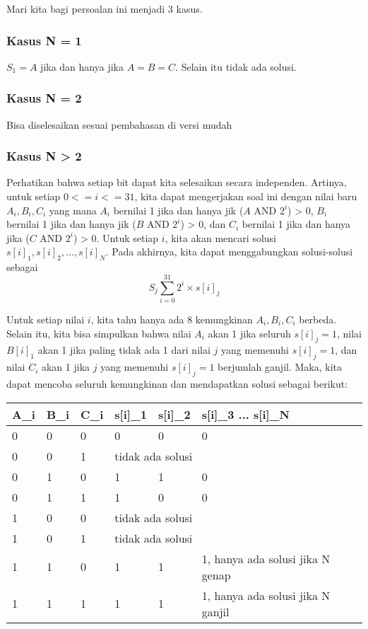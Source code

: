 \documentclass[../editorial_template.tex]{subfiles} %
\begin{document}
Mari kita bagi persoalan ini menjadi 3 kasus.
\subsubsection{Kasus N = 1}

$S_1 = A$ jika dan hanya jika $A = B = C$. Selain itu tidak ada solusi.

\subsubsection{Kasus N = 2}

Bisa diselesaikan sesuai pembahasan di versi mudah

\subsubsection{Kasus N > 2}

Perhatikan bahwa setiap bit dapat kita selesaikan secara independen. Artinya, untuk setiap $0 <= i <= 31$, kita dapat mengerjakan soal ini dengan nilai baru $A_i, B_i, C_i$ yang mana $A_i$ bernilai 1 jika dan hanya jik ($A$ AND $2^i$) > 0, $B_i$ bernilai 1 jika dan hanya jik ($B$ AND $2^i$) > 0, dan $C_i$ bernilai 1 jika dan hanya jika ($C$ AND $2^i$) > 0. Untuk setiap $i$, kita akan mencari solusi $s[i]_1, s[i]_2, ..., s[i]_N$. Pada akhirnya, kita dapat menggabungkan solusi-solusi sebagai $$S_j \sum_{i=0}^{31} 2^i \times s[i]_j$$

Untuk setiap nilai $i$, kita tahu hanya ada 8 kemungkinan $A_i, B_i, C_i$ berbeda. Selain itu, kita bisa simpulkan bahwa nilai $A_i$ akan 1 jika seluruh $s[i]_j = 1$, nilai $B[i]_1$ akan 1 jika paling tidak ada 1 dari nilai $j$ yang memenuhi $s[i]_j = 1$, dan nilai $C_i$ akan 1 jika $j$ yang memenuhi $s[i]_j = 1$ berjumlah ganjil. Maka, kita dapat mencoba seluruh kemungkinan dan mendapatkan solusi sebagai berikut:

\begin{table}[]
\centering
\begin{tabular}{@{}llllll@{}}
\hline
A\_i & B\_i & C\_i & s{[}i{]}\_1 & s{[}i{]}\_2 & s{[}i{]}\_3 ... s{[}i{]}\_N       \\ \hline
0    & 0    & 0    & 0           & 0           & 0                                 \\
0    & 0    & 1    & \multicolumn{3}{l}{tidak ada solusi}                          \\
0    & 1    & 0    & 1           & 1           & 0                                 \\
0    & 1    & 1    & 1           & 0           & 0                                 \\
1    & 0    & 0    & \multicolumn{3}{l}{tidak ada solusi}                          \\
1    & 0    & 1    & \multicolumn{3}{l}{tidak ada solusi}                          \\
1    & 1    & 0    & 1           & 1           & 1, hanya ada solusi jika N genap  \\
1    & 1    & 1    & 1           & 1           & 1, hanya ada solusi jika N ganjil \\ \hline
\end{tabular}
\end{table}
\end{document}
